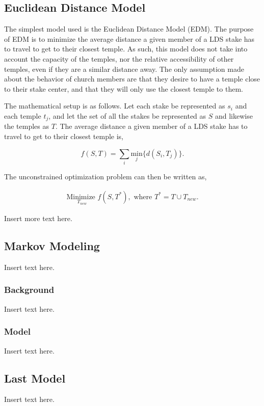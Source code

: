 \documentclass[twoside,twocolumn]{article}
\begin{document}
\subsection{Euclidean Distance Model} %

The simplest model used is the Euclidean Distance Model (EDM). The purpose of EDM is to minimize the average distance a given member of a LDS stake has to travel to get to their closest temple. As such, this model does not take into account the capacity of the temples, nor the relative accessibility of other temples, even if they are a similar distance away. The only assumption made about the behavior of church members are that they desire to have a temple close to their stake center, and that they will only use the closest temple to them.

The mathematical setup is as follows. Let each stake be represented as $s_i$ and each temple $t_j$, and let the set of all the stakes be represented as $S$ and likewise the temples as $T$. The average distance a given member of a LDS stake has to travel to get to their closest temple is, 

\begin{equation}
	f(S,T) = \sum_i \underset{j}{\text{min}}\{d(S_i,T_j)\}.
\end{equation}

The unconstrained optimization problem can then be written as,

\begin{equation}
\begin{aligned}
	\underset{T_{new}}{\text{Minimize }} f(S,T^*), \text{ where } T^* = T \cup T_{new}.
\end{aligned}
\end{equation}

Insert more text here.


\subsection{Markov Modeling}
Insert text here.
\subsubsection{Background}
Insert text here.
\subsubsection{Model}
Insert text here.
\subsection{Last Model} %
Insert text here.
\end{document}

